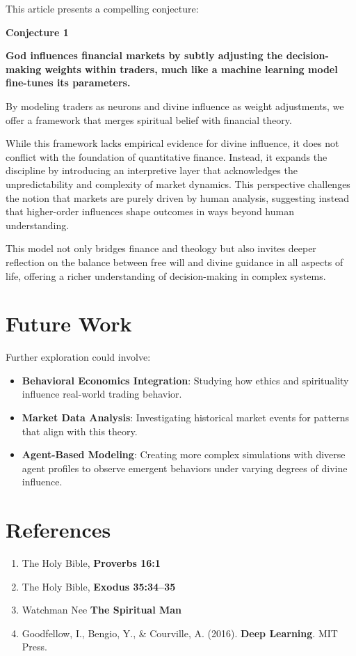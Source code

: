 \documentclass{article}
\newcommand{\bn}{\bigskip\noindent}
\begin{document}
This article presents a compelling conjecture: 

\bn
{\bf Conjecture 1}

\bn
{\bf God influences financial markets by subtly adjusting the decision-making weights within traders, much like a machine learning model fine-tunes its parameters.} 

\bn
By modeling traders as neurons and divine influence as weight adjustments, we offer a framework that merges spiritual belief with financial theory.

\bn
While this framework lacks empirical evidence for divine influence, it does not conflict with the foundation of quantitative finance. Instead, it expands the discipline by introducing an interpretive layer that acknowledges the unpredictability and complexity of market dynamics. This perspective challenges the notion that markets are purely driven by human analysis, suggesting instead that higher-order influences shape outcomes in ways beyond human understanding.

\bn
This model not only bridges finance and theology but also invites deeper reflection on the balance between free will and divine guidance in all aspects of life, offering a richer understanding of decision-making in complex systems.

\section{Future Work}

Further exploration could involve:

\begin{itemize}
\item  {\bf Behavioral Economics Integration}: Studying how ethics and spirituality influence real-world trading behavior.  
\item  {\bf Market Data Analysis}: Investigating historical market events for patterns that align with this theory.  
\item  {\bf Agent-Based Modeling}: Creating more complex simulations with diverse agent profiles to observe emergent behaviors under varying degrees of divine influence.
\end{itemize}

\section*{References}
\begin{enumerate}
\item The Holy Bible, {\bf Proverbs 16:1}
\item The Holy Bible, {\bf Exodus 35:34--35}
\item   Watchman Nee  {\bf The Spiritual Man}  
\item  Goodfellow, I., Bengio, Y., \& Courville, A. (2016). {\bf Deep Learning}. MIT Press.  
\end{enumerate}
\end{document}
